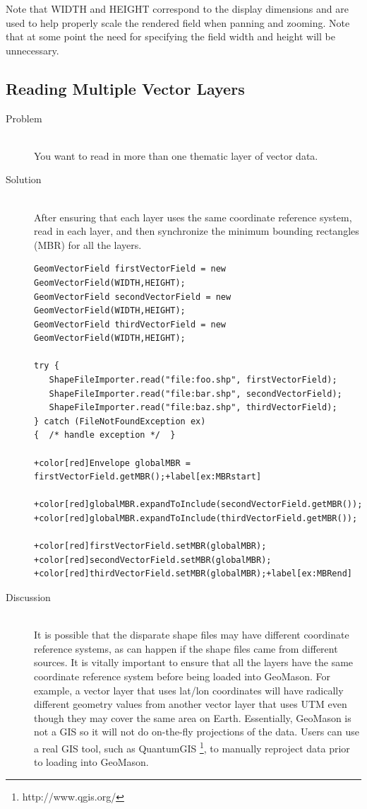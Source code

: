 \documentclass[twoside,10pt]{book}
\newcommand\code[1]{\textsf{#1}}
\begin{document}
\begin{description}
Note that \code{WIDTH} and \code{HEIGHT} correspond to the display
dimensions and are used to help properly scale the rendered field when
panning and zooming. Note  that at some point the need for specifying
the field width and height will be unnecessary.
\end{description}



\subsection{Reading Multiple Vector Layers}
\label{sub:multiplevectorlayers}

\begin{description}
\item[Problem]~\\
You want to read in more than one thematic layer of vector
data.

\item[Solution]~\\
After ensuring that each layer uses the same coordinate reference
system, read in each layer, and then synchronize the minimum bounding
rectangles (MBR) for all the layers.
\begin{Verbatim}[frame=lines,framesep=5mm,commandchars=+\[\]]
GeomVectorField firstVectorField = new GeomVectorField(WIDTH,HEIGHT);
GeomVectorField secondVectorField = new GeomVectorField(WIDTH,HEIGHT);
GeomVectorField thirdVectorField = new GeomVectorField(WIDTH,HEIGHT);

try {
   ShapeFileImporter.read("file:foo.shp", firstVectorField);
   ShapeFileImporter.read("file:bar.shp", secondVectorField);
   ShapeFileImporter.read("file:baz.shp", thirdVectorField);
} catch (FileNotFoundException ex)
{  /* handle exception */  }

+color[red]Envelope globalMBR = firstVectorField.getMBR();+label[ex:MBRstart]

+color[red]globalMBR.expandToInclude(secondVectorField.getMBR());
+color[red]globalMBR.expandToInclude(thirdVectorField.getMBR());

+color[red]firstVectorField.setMBR(globalMBR);
+color[red]secondVectorField.setMBR(globalMBR);
+color[red]thirdVectorField.setMBR(globalMBR);+label[ex:MBRend]
\end{Verbatim}

\item[Discussion]~\\
It is possible that the disparate shape files may have different
coordinate reference systems, as can happen if the shape files came
from different sources.  It is vitally important to ensure that all
the layers have the same coordinate reference system before being
loaded into GeoMason.  For example, a vector layer that uses lat/lon coordinates
will have radically different geometry values from another vector layer that
uses UTM even though they may cover the same area on Earth.
Essentially, GeoMason is not a GIS so it will not do
on-the-fly projections of the data.  Users can use a real GIS tool,
such as QuantumGIS \footnote{http://www.qgis.org/}, to manually
reproject data prior to loading into GeoMason.


\end{description}
\end{document}
